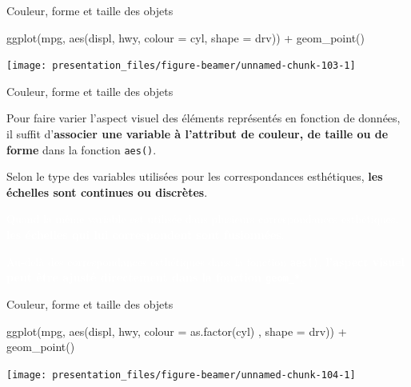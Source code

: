 \documentclass[12pt,handout,ignorenonframetext,]{beamer}
\newenvironment{Shaded}{}{}
\newcommand{\KeywordTok}[1]{\textcolor[rgb]{0.00,0.00,1.00}{#1}}
\newcommand{\DataTypeTok}[1]{#1}
\newcommand{\StringTok}[1]{\textcolor[rgb]{0.00,0.50,0.50}{#1}}
\newcommand{\OperatorTok}[1]{#1}
\newcommand{\NormalTok}[1]{#1}
\renewenvironment{Shaded}{\begin{snugshade}}{\end{snugshade}}
\begin{document}
\begin{frame}[fragile]{Couleur, forme et taille des objets}

\footnotesize \center

\begin{Shaded}
\begin{Highlighting}[]
\KeywordTok{ggplot}\NormalTok{(mpg, }\KeywordTok{aes}\NormalTok{(displ, hwy, }\DataTypeTok{colour =}\NormalTok{ cyl, }\DataTypeTok{shape =}\NormalTok{ drv)) }\OperatorTok{+}
\StringTok{  }\KeywordTok{geom_point}\NormalTok{()}
\end{Highlighting}
\end{Shaded}

\texttt{[image: presentation\_files/figure-beamer/unnamed-chunk-103-1]}

\end{frame}

\begin{frame}{Couleur, forme et taille des objets}

Pour faire varier l'aspect visuel des éléments représentés en fonction
de données, il suffit
d'\textbf{associer une variable à l'attribut de couleur, de taille ou de forme}
dans la fonction \texttt{aes()}.

Selon le type des variables utilisées pour les correspondances
esthétiques, \textbf{les échelles sont continues ou discrètes}.

\textcolor{white}{Quand la même variable est utilisée dans plusieurs correspondances esthétiques, \textbf{les échelles qui lui correspondent sont fusionnées}.}

\textcolor{white}{Au-delà des correspondances esthétiques dans la fonction \texttt{aes()}, \textbf{l'aspect visuel peut être ajusté directement dans la fonction \texttt{geom\_*}}.}

\end{frame}

\begin{frame}[fragile]{Couleur, forme et taille des objets}

\footnotesize \center

\begin{Shaded}
\begin{Highlighting}[]
\KeywordTok{ggplot}\NormalTok{(mpg, }\KeywordTok{aes}\NormalTok{(displ, hwy, }\DataTypeTok{colour =} \KeywordTok{as.factor}\NormalTok{(cyl)}
\NormalTok{  , }\DataTypeTok{shape =}\NormalTok{ drv)) }\OperatorTok{+}
\StringTok{  }\KeywordTok{geom_point}\NormalTok{()}
\end{Highlighting}
\end{Shaded}

\texttt{[image: presentation\_files/figure-beamer/unnamed-chunk-104-1]}

\end{frame}
\end{document}
